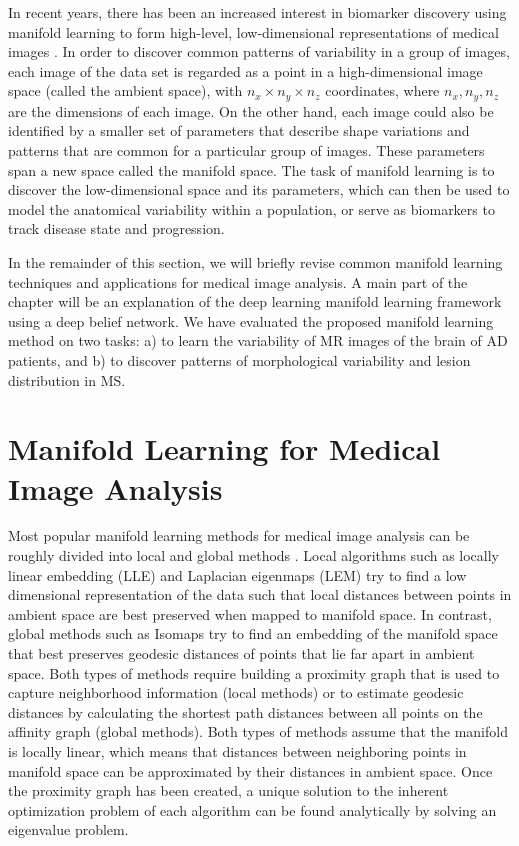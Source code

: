 In recent years, there has been an increased interest in biomarker discovery
using manifold learning to form high-level, low-dimensional representations of
medical images \citep{wolz2010b,aljabar2011,wolz2012}. In order to discover
common patterns of variability in a group of images, each image of the data set
is regarded as a point in a high-dimensional image space (called the ambient
space), with $n_x \times n_y \times n_z$ coordinates, where $n_x, n_y, n_z$ are
the dimensions of each image. On the other hand, each image could also be
identified by a smaller set of parameters that describe shape variations and
patterns that are common for a particular group of images. These parameters span
a new space called the manifold space. The task of manifold learning is to
discover the low-dimensional space and its parameters, which can then be used to
model the anatomical variability within a population, or serve as biomarkers to
track disease state and progression.

In the remainder of this section, we will briefly revise common manifold
learning techniques and applications for medical image analysis. A main part of
the chapter will be an explanation of the deep learning manifold learning
framework using a deep belief network. We have evaluated the proposed manifold
learning method on two tasks: a) to learn the variability of MR images of the
brain of AD patients, and b) to discover patterns of morphological variability
and lesion distribution in MS.

\section[Manifold learning for medical image analysis]{Manifold Learning for
Medical Image Analysis}

Most popular manifold learning methods for medical image analysis can be roughly
divided into local and global methods \citep{cayton2005}. Local algorithms such
as locally linear embedding (LLE) \citep{saul2003} and Laplacian eigenmaps (LEM)
\citep{belkin2002} try to find a low dimensional representation of the data such
that local distances between points in ambient space are best preserved when
mapped to manifold space. In contrast, global methods such as Isomaps
\citep{tenenbaum2000} try to find an embedding of the manifold space that best
preserves geodesic distances of points that lie far apart in ambient space. Both
types of methods require building a proximity graph that is used to capture
neighborhood information (local methods) or to estimate geodesic distances by
calculating the shortest path distances between all points on the affinity graph
(global methods). Both types of methods assume that the manifold is locally
linear, which means that distances between neighboring points in manifold space
can be approximated by their distances in ambient space. Once the proximity
graph has been created, a unique solution to the inherent optimization problem
of each algorithm can be found analytically by solving an eigenvalue problem.

